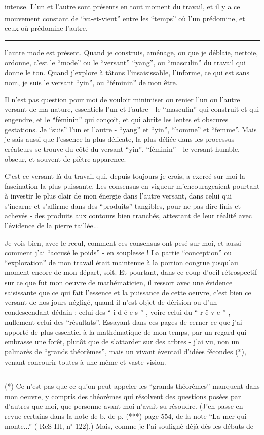 intense. L'un et l'autre sont présents en tout moment du travail, et il y a ce mouvement constant de ``va-et\textsuperscript{}-vient'' entre les ``temps'' où l'un prédomine, et ceux où prédomine l'autre.

\noindent\rule{2.1cm}{0.4pt}

l'autre mode est présent. Quand je construis, aménage, ou que je déblaie, nettoie, ordonne, c'est le ``mode'' ou le ``versant'' ``yang'', ou ``masculin'' du travail qui donne le ton. Quand j'explore à tâtons l'insaisissable, l'informe, ce qui est sans nom, je suis le versant ``yin'', ou ``féminin'' de mon être.

Il n'est pas question pour moi de vouloir minimiser ou renier l'un ou l'autre versant de ma nature, essentiels l'un et l'autre - le ``masculin'' qui construit et qui engendre, et le ``féminin'' qui conçoit, et qui abrite les lentes et obscures gestations. Je ``suis'' l'un et l'autre - ``yang'' et ``yin'', ``homme'' et ``femme''. Mais je sais aussi que l'essence la plus délicate, la plus déliée dans les processus créateurs se trouve du côté du versant ``yin'', ``féminin'' - le versant humble, obscur, et souvent de piètre apparence.

C'est ce versant-là du travail qui, depuis toujours je crois, a exercé sur moi la fascination la plus puissante. Les consensus en vigueur m'encourageaient pourtant à investir le plus clair de mon énergie dans l'autre versant, dans celui qui s'incarne et s'affirme dans des ``produits'' tangibles, pour ne pas dire finis et achevés - des produits aux contours bien tranchés, attestant de leur réalité avec l'évidence de la pierre taillée...

Je vois \qquad bien, avec le recul, comment ces consensus ont pesé sur moi, et aussi comment j'ai ``accusé le poids'' - en souplesse ! La partie ``conception'' ou ``exploration'' de mon travail était maintenue à la portion congrue jusqu'au moment encore de mon départ, soit. Et pourtant, dans ce coup d'oeil rétrospectif sur ce que fut mon oeuvre de mathématicien, il ressort avec une évidence saisissante que ce qui fait l'essence et la puissance de cette oeuvre, c'est bien ce versant de nos jours négligé, quand il n'est objet de dérision ou d'un condescendant dédain : celui des `` i d é e s '' , voire celui du `` r ê v e '' , nullement celui des ``résultats''. Essayant dans ces pages de cerner ce que j'ai apporté de plus essentiel à la mathématique de mon temps, par un regard qui embrasse une forêt, plutôt que de s'attarder sur des arbres - j'ai vu, non un palmarès de ``grands théorèmes'', mais un vivant éventail d'idées fécondes (*), venant concourir toutes à une même et vaste vision.

\noindent\rule{1.8cm}{0.4pt}

(*) Ce n'est pas que ce qu'on peut appeler les ``grands théorèmes'' manquent dans mon oeuvre, y compris des théorèmes qui résolvent des questions posées par d'autres que moi, que personne avant moi n'avait su résoudre. (J'en passe en revue certains dans la note de b. de p. (***) page 554, de la note ``La mer qui monte...'' ( ReS III, n$^\circ$ 122).) Mais, comme je l'ai souligné déjà dès les débuts de

